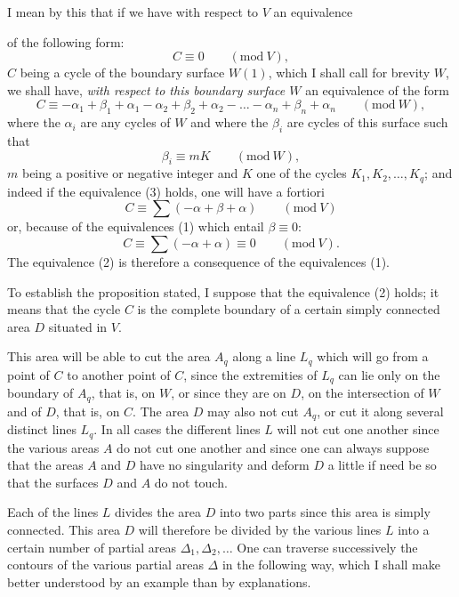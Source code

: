 \documentclass{article}
\begin{document}
I mean by this that if we have with respect to $V$ an equivalence

of the following form:
\[ C \equiv 0 \qquad (\text{mod}\ V), \tag{2} \]
$C$ being a cycle of the boundary surface $W(1)$, which I shall call for brevity $W$, we shall have, \emph{with respect to this boundary surface $W$} an equivalence of the form
\[ C \equiv -\alpha_{1} + \beta_{1} + \alpha_{1} - \alpha_{2} + \beta_{2} + \alpha_{2} - \ldots - \alpha_{n} + \beta_{n} + \alpha_{n} \qquad (\text{mod}\ W), \tag{3} \]
where the $\alpha_{i}$ are any cycles of $W$ and where the $\beta_{i}$ are cycles of this surface such that
\[ \beta_{i} \equiv mK \qquad (\text{mod}\ W), \]
$m$ being a positive or negative integer and $K$ one of the cycles $K_{1}, K_{2}, \ldots, K_{q}$; and indeed if the equivalence (3) holds, one will have a fortiori
\[ C \equiv \sum (-\alpha + \beta + \alpha) \qquad (\text{mod}\ V) \]
or, because of the equivalences (1) which entail $\beta \equiv 0$:
\[ C \equiv \sum (-\alpha + \alpha) \equiv 0 \qquad (\text{mod}\ V). \]
The equivalence (2) is therefore a consequence of the equivalences (1).

To establish the proposition stated, I suppose that the equivalence (2) holds; it means that the cycle $C$ is the complete boundary of a certain simply connected area $D$ situated in $V$.

This area will be able to cut the area $A_{q}$ along a line $L_{q}$ which will go from a point of $C$ to another point of $C$, since the extremities of $L_{q}$ can lie only on the boundary of $A_{q}$, that is, on $W$, or since they are on $D$, on the intersection of $W$ and of $D$, that is, on $C$. The area $D$ may also not cut $A_{q}$, or cut it along several distinct lines $L_{q}$. In all cases the different lines $L$ will not cut one another since the various areas $A$ do not cut one another and since one can always suppose that the areas $A$ and $D$ have no singularity and deform $D$ a little if need be so that the surfaces $D$ and $A$ do not touch.

Each of the lines $L$ divides the area $D$ into two parts since this area is simply connected. This area $D$ will therefore be divided by the various lines $L$ into a certain number of partial areas $\Delta_{1}, \Delta_{2}, \ldots$ One can traverse successively the contours of the various partial areas $\Delta$ in the following way, which I shall make better understood by an example than by explanations.
\end{document}
